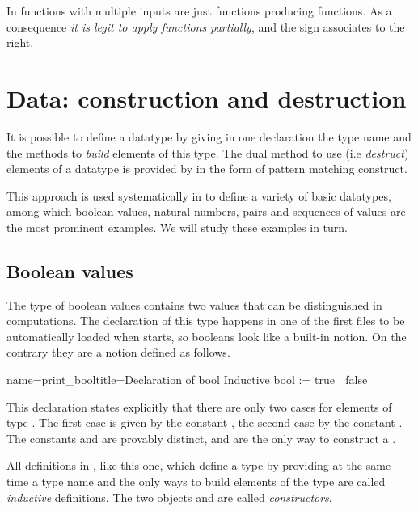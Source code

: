 In \Coq{} functions with multiple inputs are just functions producing
functions.  As a consequence \emph{it is legit to apply functions partially},
and the \C{->} sign associates to the right.

\section{Data: construction and destruction}
It is possible to define a datatype by giving in one declaration
the type name and the methods to \emph{build} elements of this type.
The dual method to use (i.e \emph{destruct})
elements of a datatype is provided by
\Coq{} in the form of pattern matching construct.

This approach is used
systematically in \Coq{} to define a variety of basic datatypes, among
which boolean values, natural numbers, pairs and sequences of values
are the most prominent examples.  We will study these examples in
turn.

\subsection{Boolean values}
The type  of boolean values contains two values that can be
distinguished in computations.  The declaration of this type happens
in one of the first files to be automatically loaded when \Coq{} starts,
so booleans look like a built-in notion.  On the contrary they are a
notion defined as follows.

\begin{coq}{name=print_bool}{title=Declaration of bool}
Inductive bool := true | false
\end{coq}
This declaration states explicitly that there are only two cases for
elements of type .  The first case is given by the constant
, the second case by the constant .  
The constants  and  are provably distinct, and
are the only way to construct a .

All definitions
in \Coq{}, like this one, which define a type by providing at the same time a type
name and the only ways to build elements of the type are called {\em inductive}
definitions.  The two objects  and  are called
\emph{constructors}.

